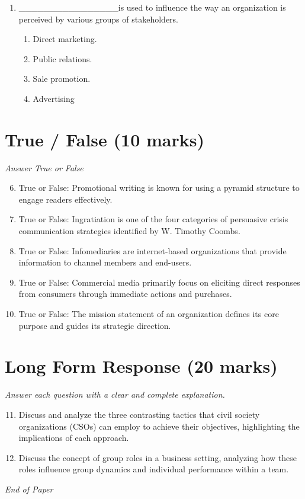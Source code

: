 \documentclass[12pt]{article}
\begin{document}
\begin{enumerate}[label=\arabic*.]
\begin{enumerate}[label=(\alph*)]
    \item Guiding, demonstrating and motivating
    \item Guiding, mentoring and demonstrating
\end{enumerate}
\item \_\_\_\_\_\_\_\_\_\_\_\_\_\_\_\_is used to influence the way an organization is perceived by various groups of stakeholders.
\begin{enumerate}[label=(\alph*)]
    \item Direct marketing.
    \item Public relations.
    \item Sale promotion.
    \item Advertising
\end{enumerate}
\end{enumerate}

\section*{True / False (10 marks)}
\textit{Answer True or False}
\begin{enumerate}[label=\arabic*.]
\setcounter{enumi}{5}
\item True or False: Promotional writing is known for using a pyramid structure to engage readers effectively.
\item True or False: Ingratiation is one of the four categories of persuasive crisis communication strategies identified by W. Timothy Coombs.
\item True or False: Infomediaries are internet-based organizations that provide information to channel members and end-users.
\item True or False: Commercial media primarily focus on eliciting direct responses from consumers through immediate actions and purchases.
\item True or False: The mission statement of an organization defines its core purpose and guides its strategic direction.
\end{enumerate}

\section*{Long Form Response (20 marks)}
\textit{Answer each question with a clear and complete explanation.}
\begin{enumerate}[label=\arabic*.]
\setcounter{enumi}{10}
\item Discuss and analyze the three contrasting tactics that civil society organizations (CSOs) can employ to achieve their objectives, highlighting the implications of each approach.
\item Discuss the concept of group roles in a business setting, analyzing how these roles influence group dynamics and individual performance within a team.
\end{enumerate}

\vfill
\noindent\textit{End of Paper}
\end{document}
